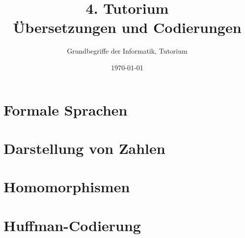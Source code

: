 




\title[Übersetzungen und Codierungen]{4. Tutorium\\ Übersetzungen und Codierungen}
\subtitle{Grundbegriffe der Informatik, Tutorium \hashtag\mytutnumber}
\date{\today}


\titleframe
\roadmap

% 


\section{Formale Sprachen}


\section{Darstellung von Zahlen}


\section{Homomorphismen}


\section{Huffman-Codierung}


%

